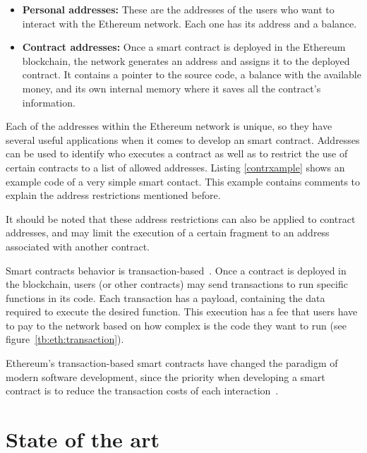 \begin{itemize}

\item \textbf{Personal addresses:} These are the addresses of the users who want
  to interact with the Ethereum network. Each one has its address and a balance.
  
\item \textbf{Contract addresses:} Once a smart contract is deployed in the
  Ethereum blockchain, the network generates an address and assigns it to the
  deployed contract. It contains a pointer to the source code, a balance with
  the available money, and its own internal memory where it saves all the
  contract's information.

\end{itemize}

Each of the addresses within the Ethereum network is unique, so they have
several useful applications when it comes to develop an smart contract.
Addresses can be used to identify who executes a contract as well as to restrict
the use of certain contracts to a list of allowed addresses. Listing
\ref{contrxample} shows an example code of a very simple smart contact. This
example contains comments to explain the address restrictions mentioned before.

It should be noted that these address restrictions can also be applied to
contract addresses, and may limit the execution of a certain fragment to an
address associated with another contract.



Smart contracts behavior is transaction-based~\cite{wood2014ethereum}. Once a
contract is deployed in the blockchain, users (or other contracts) may send
transactions to run specific functions in its code. Each transaction has a
payload, containing the data required to execute the desired function. This
execution has a fee that users have to pay to the network based on how complex
is the code they want to run (see figure~\ref{tb:eth:transaction}).

Ethereum's transaction-based smart contracts have changed the paradigm of modern
software development, since the priority when developing a smart contract is to
reduce the transaction costs of each interaction~\cite{delmolino2016step}.


\section{State of the art}
\label{sec:state-art}

